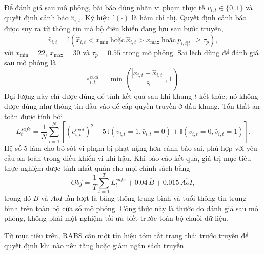 \documentclass[10pt]{article}
\begin{document}
Để đánh giá sau mô phỏng, bài báo dùng nhãn vi phạm thực tế $v_{i,t}\in\{0,1\}$ và quyết định cảnh báo $\hat v_{i,t}$. Ký hiệu $\mathbb{I}(\cdot)$ là hàm chỉ thị. Quyết định cảnh báo được suy ra từ thông tin mà bộ điều khiển đang lưu sau bước truyền,
\begin{equation}
\hat{v}_{i,t}=\mathbb{I}\left(\hat{x}_{i,t}<x_{\min}\ \text{hoặc}\ \hat{x}_{i,t}>x_{\max}\ \text{hoặc}\ p_{i,t|t^-}\ge \tau_p\right),
\end{equation}
với $x_{\min}=22$, $x_{\max}=30$ và $\tau_p=0.55$ trong mô phỏng. Sai lệch dùng để đánh giá sau mô phỏng là
\begin{equation}
e^{eval}_{i,t}=\min\left(\frac{|x_{i,t}-\hat{x}_{i,t}|}{8},1\right).
\end{equation}
Đại lượng này chỉ được dùng để tính kết quả sau khi khung $t$ kết thúc; nó không được dùng như thông tin đầu vào để cấp quyền truyền ở đầu khung. Tổn thất an toàn được tính bởi
\begin{equation}
L^{safe}_t=\frac{1}{N}\sum_{i=1}^{N}\left[(e^{eval}_{i,t})^2+5\,\mathbb{I}(v_{i,t}=1,\hat{v}_{i,t}=0)+\mathbb{I}(v_{i,t}=0,\hat{v}_{i,t}=1)\right].
\end{equation}
Hệ số 5 làm cho bỏ sót vi phạm bị phạt nặng hơn cảnh báo sai, phù hợp với yêu cầu an toàn trong điều khiển vi khí hậu. Khi báo cáo kết quả, giá trị mục tiêu thực nghiệm được tính nhất quán cho mọi chính sách bằng
\begin{equation}
Obj=\frac{1}{T}\sum_{t=1}^{T}L^{safe}_t+0.04\,\overline{B}+0.015\,\overline{AoI},
\end{equation}
trong đó $\overline{B}$ và $\overline{AoI}$ lần lượt là băng thông trung bình và tuổi thông tin trung bình trên toàn bộ cửa sổ mô phỏng. Công thức này là thước đo đánh giá sau mô phỏng, không phải một nghiệm tối ưu biết trước toàn bộ chuỗi dữ liệu.

Từ mục tiêu trên, RABS cần một tín hiệu tóm tắt trạng thái trước truyền để quyết định khi nào nên tăng hoặc giảm ngân sách truyền.
\end{document}
